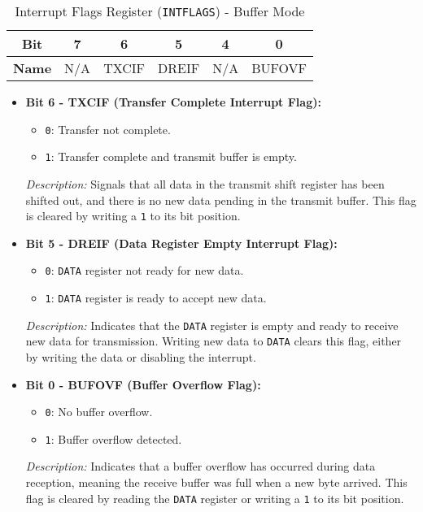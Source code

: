   \begin{table}[H]
      \centering
      \caption{Interrupt Flags Register (\texttt{INTFLAGS}) - Buffer Mode}
      \begin{tabular}{@{}cccccc@{}}
          \toprule
          \textbf{Bit} & 7 & 6 & 5 & 4 & 0 \\ \midrule
          \textbf{Name} & N/A & TXCIF & DREIF & N/A & BUFOVF \\ \bottomrule
      \end{tabular}
      \label{tab:intflags_buffer}
  \end{table}
  
  \begin{itemize}
      
      \item \textbf{Bit 6 - TXCIF (Transfer Complete Interrupt Flag):} 
      \begin{itemize}
          \item \texttt{0}: Transfer not complete.
          \item \texttt{1}: Transfer complete and transmit buffer is empty.
      \end{itemize}
      \textit{Description:} Signals that all data in the transmit shift register has been shifted out, and there is no new data pending in the transmit buffer. This flag is cleared by writing a \texttt{1} to its bit position.
      
      \item \textbf{Bit 5 - DREIF (Data Register Empty Interrupt Flag):} 
      \begin{itemize}
          \item \texttt{0}: \texttt{DATA} register not ready for new data.
          \item \texttt{1}: \texttt{DATA} register is ready to accept new data.
      \end{itemize}
      \textit{Description:} Indicates that the \texttt{DATA} register is empty and ready to receive new data for transmission. Writing new data to \texttt{DATA} clears this flag, either by writing the data or disabling the interrupt.
      
      \item \textbf{Bit 0 - BUFOVF (Buffer Overflow Flag):} 
      \begin{itemize}
          \item \texttt{0}: No buffer overflow.
          \item \texttt{1}: Buffer overflow detected.
      \end{itemize}
      \textit{Description:} Indicates that a buffer overflow has occurred during data reception, meaning the receive buffer was full when a new byte arrived. This flag is cleared by reading the \texttt{DATA} register or writing a \texttt{1} to its bit position.
  \end{itemize}
  

